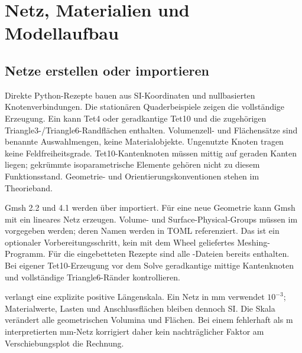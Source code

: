 \chapter{Netz, Materialien und Modellaufbau}\label{sec:app-models}
\section{Netze erstellen oder importieren}
Direkte Python-Rezepte bauen  aus SI-Koordinaten
und nullbasierten Knotenverbindungen. Die stationären Quaderbeispiele zeigen
die vollständige Erzeugung. Ein  kann Tet4 oder geradkantige Tet10
und die zugehörigen Triangle3-/Triangle6-Randflächen enthalten. Volumenzell-
und Flächensätze sind benannte Auswahlmengen, keine Materialobjekte.
Ungenutzte Knoten tragen keine Feldfreiheitsgrade. Tet10-Kantenknoten müssen
mittig auf geraden Kanten liegen; gekrümmte isoparametrische Elemente gehören
nicht zu diesem Funktionsstand. Geometrie- und Orientierungskonventionen
stehen im Theorieband.

Gmsh 2.2 und 4.1 werden über  importiert. Für eine neue
Geometrie kann Gmsh mit 
ein lineares Netz erzeugen. Volume- und Surface-Physical-Groups müssen im
 vorgegeben werden; deren Namen werden in TOML referenziert.
Das ist ein optionaler Vorbereitungsschritt, kein mit dem Wheel geliefertes
Meshing-Programm. Für die eingebetteten Rezepte sind alle -Dateien
bereits enthalten. Bei eigener Tet10-Erzeugung vor dem Solve geradkantige
mittige Kantenknoten und vollständige Triangle6-Ränder kontrollieren.

 verlangt eine explizite positive
Längenskala. Ein Netz in mm verwendet $10^{-3}$; Materialwerte, Lasten und
Anschlussflächen bleiben dennoch SI. Die Skala verändert alle geometrischen
Volumina und Flächen. Bei einem fehlerhaft als m interpretierten mm-Netz
korrigiert daher kein nachträglicher Faktor am Verschiebungsplot die Rechnung.

